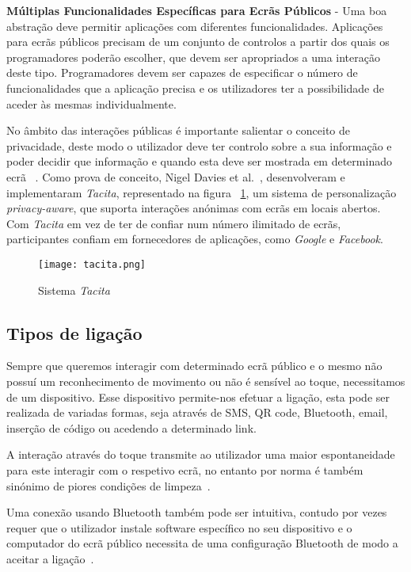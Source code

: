 \textbf{Múltiplas Funcionalidades Específicas para Ecrãs Públicos} - Uma boa abstração deve permitir aplicações com diferentes funcionalidades. Aplicações para ecrãs públicos precisam de um conjunto de controlos a partir dos quais os programadores poderão escolher, que devem ser apropriados a uma interação deste tipo. Programadores devem ser capazes de especificar o número de funcionalidades que a aplicação precisa e os utilizadores ter a possibilidade de aceder às mesmas individualmente.

No âmbito das interações públicas é importante salientar o conceito de privacidade, deste modo o utilizador deve ter controlo sobre a sua informação e poder decidir que informação e quando esta deve ser mostrada em determinado ecrã ~\cite{Davies2012b}. Como prova de conceito, Nigel Davies et al.~\cite{Davies2012b}, desenvolveram e implementaram \textit{Tacita}, representado na figura ~\ref{fig:tacita}, um sistema de personalização \textit{privacy-aware}, que suporta interações anónimas com ecrãs em locais abertos. Com \textit{Tacita} em vez de ter de confiar num número ilimitado de ecrãs, participantes confiam em fornecedores de aplicações, como \textit{Google} e \textit{Facebook}.

\begin{figure}[ht]
\centering
\texttt{[image: tacita.png]}
\caption[Sistema \textit{Tacita}] {Sistema \textit{Tacita} ~\cite{Davies2012b}}
\label{fig:tacita}
\end{figure}

\subsection{Tipos de ligação}

Sempre que queremos interagir com determinado ecrã público e o mesmo não possuí um reconhecimento de movimento ou não é sensível ao toque, necessitamos de um dispositivo. Esse dispositivo permite-nos efetuar a ligação, esta pode ser realizada de variadas formas, seja através de SMS, QR code, Bluetooth, email, inserção de código ou acedendo a determinado link.

A interação através do toque transmite ao utilizador uma maior espontaneidade para este interagir com o respetivo ecrã, no entanto por norma é também sinónimo de piores condições de limpeza~\cite{Ballagas}.

Uma conexão usando Bluetooth também pode ser intuitiva, contudo por vezes requer que o utilizador instale software específico no seu dispositivo e o computador do ecrã público necessita de uma configuração Bluetooth de modo a aceitar a ligação~\cite{Ballagas}.

